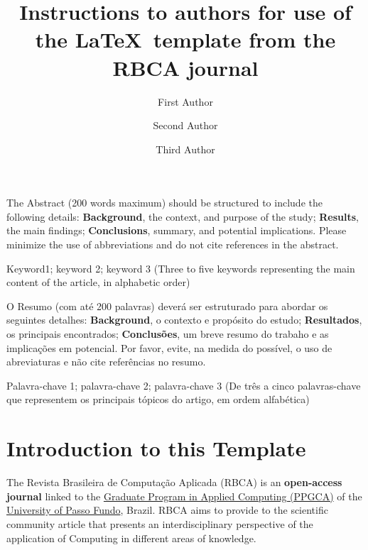 \documentclass[alpha-refs,english]{RBCA_v3.0}
\title{Instructions to authors for use of the \LaTeX\ template from the RBCA journal}
\author[1]{First Author \orcid{0000-0000-0000-0000}}
\author[2]{Second Author \orcid{0000-0000-0000-0000}}
\author[2]{Third Author}
\affil[1]{First Institution}
\affil[2]{Second Institution}
\begin{document}
\begin{frontmatter}
	
\maketitle
\thispagestyle{empty}

\begin{Abstract} %
The Abstract (200 words maximum) should be structured to include the following details: \textbf{Background}, the context, and purpose of the study; \textbf{Results}, the main findings; \textbf{Conclusions}, summary, and potential implications. Please minimize the use of abbreviations and do not cite references in the abstract.
\end{Abstract}

\begin{keywords}
Keyword1; keyword 2; keyword 3 (Three to five keywords representing the main content of the article, in alphabetic order)
\end{keywords}

\begin{resumo} %
	O Resumo (com até 200 palavras) deverá ser estruturado para abordar os seguintes detalhes: \textbf{Background}, o contexto e propósito do estudo; \textbf{Resultados}, os principais encontrados; \textbf{Conclusões}, um breve resumo do trabaho e as implicações em potencial. Por favor, evite, na medida do possível, o uso de abreviaturas e não cite referências no resumo.
\end{resumo}

\begin{palavras_chave} %
	Palavra-chave 1; palavra-chave 2; palavra-chave 3 (De três a cinco palavras-chave que representem os principais tópicos do artigo, em ordem alfabética)
\end{palavras_chave}

\end{frontmatter}


\section{Introduction to this Template}
The Revista Brasileira de Computação Aplicada (RBCA) is an \textbf{open-access journal} linked to the \href{http://ppgca.upf.br}{Graduate Program in Applied Computing (PPGCA)} of the \href{http://www.upf.br}{University of Passo Fundo}, Brazil. RBCA aims to provide to the scientific community article that presents an interdisciplinary perspective of the application of Computing in different areas of knowledge.
\end{document}
